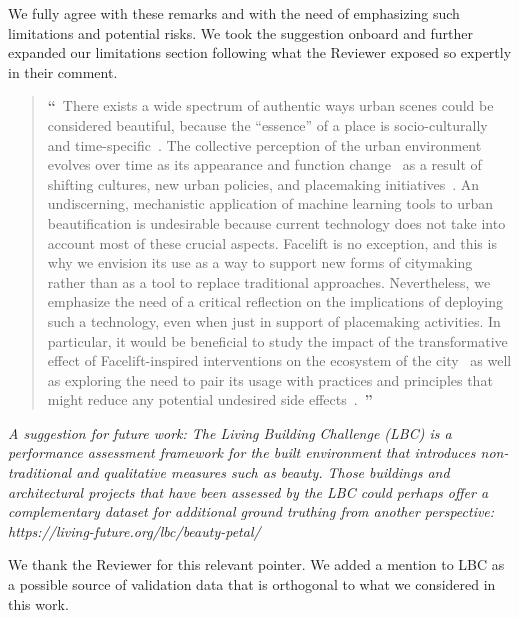 \documentclass{paper}
\newenvironment{myquote}
{\definecolor{shadecolor}{rgb}{0.9,0.95,1} \begin{shaded*} \sf \em}
{\em\end{shaded*}}
\begin{document}
\noindent We fully agree with these remarks and with the need of emphasizing such limitations and potential risks. We took the suggestion onboard and further expanded our limitations section following what the Reviewer exposed so expertly in their comment.

\begin{quote}
{\bf \Large ``}~There exists a wide spectrum of authentic ways urban scenes could be considered beautiful, because the ``essence'' of a place is socio-culturally and time-specific~\cite{norberg80genius}. The collective perception of the urban environment evolves over time as its appearance and function change~\cite{brand1995buildings} as a result of shifting cultures, new urban policies, and placemaking initiatives~\cite{foth2017lessons}. An undiscerning, mechanistic application of machine learning tools to urban beautification is undesirable because current technology does not take into account most of these crucial aspects. Facelift is no exception, and this is why we envision its use as a way to support new forms of citymaking rather than as a tool to replace traditional approaches. Nevertheless, we emphasize the need of a critical reflection on the implications of deploying such a technology, even when just in support of placemaking activities. In particular, it would be beneficial to study the impact of the transformative effect of Facelift-inspired interventions on the ecosystem of the city~\cite{dourish2016algorithms,kitchin2017thinking} as well as exploring the need to pair its usage with practices and principles that might reduce any potential undesired side effects~\cite{kitchin2016ethics}.~{\bf \Large ''}
\end{quote}

\begin{myquote}
    A suggestion for future work: The Living Building Challenge (LBC) is a performance assessment framework for the built environment that introduces non-traditional and qualitative measures such as beauty. Those buildings and architectural projects that have been assessed by the LBC could perhaps offer a complementary dataset for additional ground truthing from another perspective: https://living-future.org/lbc/beauty-petal/ 
\end{myquote}

\noindent We thank the Reviewer for this relevant pointer. We added a mention to LBC as a possible source of validation data that is orthogonal to what we considered in this work.

\vspace{20pt}
\end{document}
